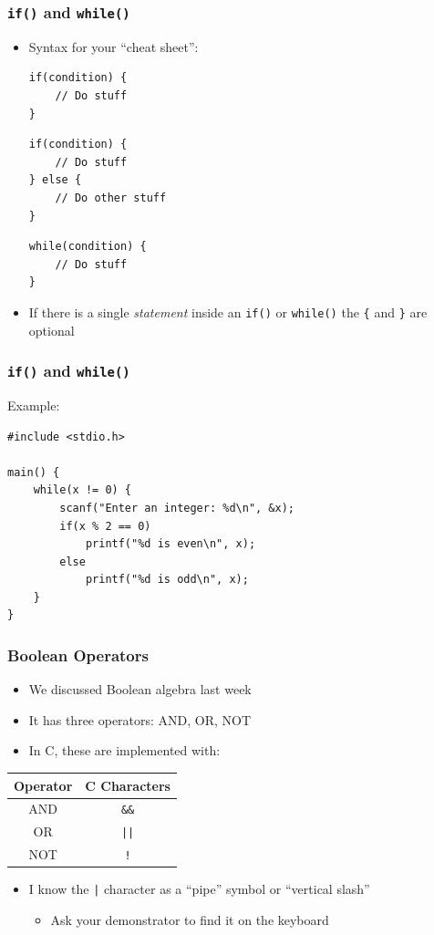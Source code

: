 \documentclass[14pt]{beamer}
\begin{document}
\begin{frame}[fragile]
\frametitle{\texttt{if()} and \texttt{while()}}
\begin{itemize}
\item Syntax for your ``cheat sheet'':

\begin{lstlisting}[style=CStyle]
if(condition) {
	// Do stuff
}
\end{lstlisting}

\begin{lstlisting}[style=CStyle]
if(condition) {
	// Do stuff
} else {
	// Do other stuff
}
\end{lstlisting}

\begin{lstlisting}[style=CStyle]
while(condition) {
	// Do stuff
}
\end{lstlisting}
\item If there is a single \textit{statement} inside an \texttt{if()} or \texttt{while()} the \texttt{\{} and \texttt{\}} are optional
\end{itemize}
\end{frame}

\begin{frame}[fragile]
\frametitle{\texttt{if()} and \texttt{while()}}
Example:
\begin{lstlisting}[style=CStyle]
#include <stdio.h>

main() {
	while(x != 0) {
		scanf("Enter an integer: %d\n", &x);
		if(x % 2 == 0)
			printf("%d is even\n", x);
		else
			printf("%d is odd\n", x);
	}
}
\end{lstlisting}
\end{frame}


\begin{frame}
\frametitle{Boolean Operators}
\begin{itemize}
\item We discussed Boolean algebra last week
\item It has three operators: AND, OR, NOT
\item In C, these are implemented with:
\end{itemize}
\vspace{-5mm}
\begin{table}[]
\begin{tabular}{|c|c|}
\hline
Operator & C Characters \\
\hline
AND      & \texttt{\&\&}         \\
OR       & \texttt{||}           \\
NOT      & \texttt{!}           \\
\hline
\end{tabular}
\end{table}
\vspace{-5mm}
\begin{itemize}
\item I know the \texttt{|} character as a ``pipe'' symbol or ``vertical slash''
	\begin{itemize}
		\item Ask your demonstrator to find it on the keyboard
	\end{itemize}
\end{itemize}
\end{frame}
\end{document}

